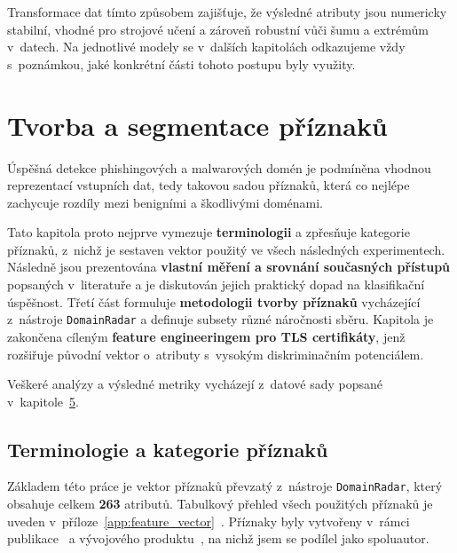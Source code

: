 Transformace dat tímto způsobem zajišťuje, že výsledné atributy jsou numericky stabilní, vhodné pro strojové učení a zároveň robustní vůči šumu a extrémům v~datech. Na jednotlivé modely se v~dalších kapitolách odkazujeme vždy s~poznámkou, jaké konkrétní části tohoto postupu byly využity.




\chapter{Tvorba a segmentace  příznaků}
\label{chapter:6}
Úspěšná detekce phishingových a malwarových domén je podmíněna vhodnou
reprezentací vstupních dat, tedy takovou sadou příznaků, která co
nejlépe zachycuje rozdíly mezi benigními a škodlivými doménami.

Tato kapitola proto nejprve vymezuje \textbf{terminologii}
a zpřesňuje kategorie příznaků, z~nichž je sestaven vektor použitý ve
všech následných experimentech. Následně jsou prezentována
\textbf{vlastní měření a srovnání současných přístupů} popsaných v~literatuře a je diskutován jejich praktický dopad na klasifikační úspěšnost.
Třetí část formuluje \textbf{metodologii tvorby příznaků} vycházející
z~nástroje \texttt{DomainRadar} a definuje subsety různé náročnosti
sběru. \cite{fit-vut-product-838}  Kapitola je zakončena cíleným \textbf{feature engineeringem pro
TLS certifikáty}, jenž rozšiřuje původní vektor o~atributy s~vysokým
diskriminačním potenciálem.

Veškeré analýzy a výsledné metriky vycházejí z~datové sady
popsané v~kapitole~\hyperref[chapter:5]{5}.


\section{Terminologie a kategorie příznaků}

Základem této práce je vektor příznaků převzatý z~nástroje \mbox{\texttt{DomainRadar}}, který obsahuje celkem \textbf{263} atributů. 
Tabulkový přehled všech použitých příznaků je uveden v~příloze~\ref{app:feature_vector}~\cite{domainradar}.
Příznaky byly vytvořeny v~rámci publikace~\cite{noms} a vývojového produktu~\cite{fit-vut-product-838}, na nichž jsem se podílel jako spoluautor.


